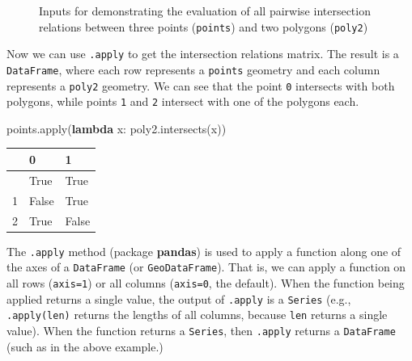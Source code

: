 \documentclass[
  letterpaper,
]{krantz}
\newenvironment{Shaded}{\begin{snugshade}}{\end{snugshade}}
\newcommand{\BuiltInTok}[1]{\textcolor[rgb]{0.00,0.23,0.31}{#1}}
\newcommand{\KeywordTok}[1]{\textcolor[rgb]{0.00,0.23,0.31}{\textbf{#1}}}
\newcommand{\NormalTok}[1]{\textcolor[rgb]{0.00,0.23,0.31}{#1}}
\begin{document}
\begin{figure}[H]


\caption{\label{fig-spatial-relations-geoms2}Inputs for demonstrating
the evaluation of all pairwise intersection relations between three
points (\texttt{points}) and two polygons (\texttt{poly2})}

\end{figure}%

Now we can use \texttt{.apply} to get the intersection relations matrix.
The result is a \texttt{DataFrame}, where each row represents a
\texttt{points} geometry and each column represents a \texttt{poly2}
geometry. We can see that the point \texttt{0} intersects with both
polygons, while points \texttt{1} and \texttt{2} intersect with one of
the polygons each.

\begin{Shaded}
\begin{Highlighting}[]
\NormalTok{points.}\BuiltInTok{apply}\NormalTok{(}\KeywordTok{lambda}\NormalTok{ x: poly2.intersects(x))}
\end{Highlighting}
\end{Shaded}

\begin{longtable}[]{@{}lll@{}}
\toprule\noalign{}
& 0 & 1 \\
\midrule\noalign{}
\endhead
\bottomrule\noalign{}
\endlastfoot
0 & True & True \\
1 & False & True \\
2 & True & False \\
\end{longtable}

\begin{tcolorbox}[enhanced jigsaw, title=\textcolor{quarto-callout-note-color}{\faInfo}\hspace{0.5em}{Note}, arc=.35mm, toprule=.15mm, titlerule=0mm, colframe=quarto-callout-note-color-frame, breakable, toptitle=1mm, bottomtitle=1mm, rightrule=.15mm, colbacktitle=quarto-callout-note-color!10!white, leftrule=.75mm, left=2mm, bottomrule=.15mm, opacityback=0, coltitle=black, opacitybacktitle=0.6, colback=white]

The \texttt{.apply} method (package \textbf{pandas}) is used to apply a
function along one of the axes of a \texttt{DataFrame} (or
\texttt{GeoDataFrame}). That is, we can apply a function on all rows
(\texttt{axis=1}) or all columns (\texttt{axis=0}, the default). When
the function being applied returns a single value, the output of
\texttt{.apply} is a \texttt{Series} (e.g., \texttt{.apply(len)} returns
the lengths of all columns, because \texttt{len} returns a single
value). When the function returns a \texttt{Series}, then
\texttt{.apply} returns a \texttt{DataFrame} (such as in the above
example.)

\end{tcolorbox}
\end{document}
